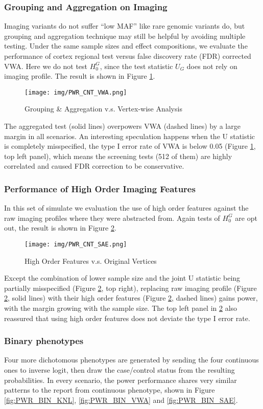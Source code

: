 \subsubsection{Grouping and Aggregation on Imaging}
Imaging variants do not suffer ``low MAF'' like rare genomic variants do, but grouping and aggregation technique may still be helpful by avoiding multiple testing. Under the same sample sizes and effect compositions, we evaluate the performance of cortex regional test versus false discovery rate (FDR) corrected VWA. Here we do not test $H_0^G$, since the test statistic $U_G$ does not rely on imaging profile. The result is shown in Figure \ref{fig:PWR_CNT_VWA}.
\begin{figure}[!htbp]
\centering
\texttt{[image: img/PWR\_CNT\_VWA.png]}
\caption{Grouping \& Aggregation v.s. Vertex-wise Analysis}
\label{fig:PWR_CNT_VWA}
\end{figure}
The aggregated test (solid lines) overpowers VWA (dashed lines) by a large margin in all scenarios. An interesting speculation happens when the U statistic is completely misspecified, the type I error rate of VWA is below 0.05 (Figure \ref{fig:PWR_CNT_VWA}, top left panel), which means the screening tests (512 of them) are highly correlated and caused FDR correction to be conservative. 

\subsubsection{Performance of High Order Imaging Features}
In this set of simulate we evaluation the use of high order features against the raw imaging profiles where they were abstracted from. Again tests of $H_0^G$ are opt out, the result is shown in Figure \ref{fig:PWR_CNT_SAE}.
\begin{figure}[!htbp]
\centering
\texttt{[image: img/PWR\_CNT\_SAE.png]}
\caption{High Order Features v.s. Original Vertices}
\label{fig:PWR_CNT_SAE}
\end{figure}
Except the combination of lower sample size and the joint U statistic being partially misspecified (Figure \ref{fig:PWR_CNT_SAE}, top right), replacing raw imaging profile (Figure \ref{fig:PWR_CNT_SAE}, solid lines) with their high order features (Figure \ref{fig:PWR_CNT_SAE}, dashed lines) gains power, with the margin growing with the sample size. The top left panel in \ref{fig:PWR_CNT_SAE} also reassured that using high order features does not deviate the type I error rate.

\subsubsection{Binary phenotypes}
Four more dichotomous phenotypes are generated by sending the four continuous ones to inverse logit, then draw the case/control status from the resulting probabilities. In every scenario, the power performance shares very similar patterns to the report from continuous phenotype, shown in Figure \ref{fig:PWR_BIN_KNL}, \ref{fig:PWR_BIN_VWA} and \ref{fig:PWR_BIN_SAE}.

